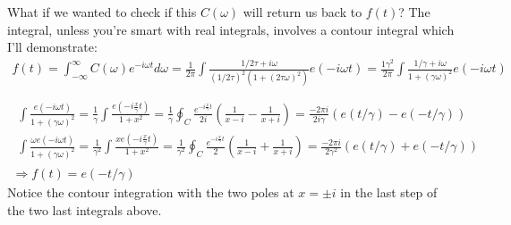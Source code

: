 \documentclass[twoside,10pt]{amsart}
\begin{document}
What if we wanted to check if this $C(\omega)$ will return us back to $f(t)$?  The integral, unless you're smart with real integrals, involves a contour integral which I'll demonstrate: 
\[
\begin{gathered}
  f(t) = \int_{-\infty}^{\infty} C(\omega) e^{- i \omega t} d\omega = \frac{1}{2\pi } \int \frac{ 1/2\tau + i \omega }{ (1/2\tau)^2 (1 + (2\tau \omega)^2 ) } e(-i\omega t) = \frac{1\gamma^2}{2\pi  } \int \frac{ 1/\gamma + i \omega }{ 1 + ( \gamma \omega)^2 } e(-i \omega t)  \\
\quad \\ 
\begin{gathered}
  \int \frac{ e(-i \omega t)}{ 1 + (\gamma \omega)^2 } = \frac{1}{ \gamma} \int \frac{e\left( -i \frac{x}{\gamma} t \right) }{ 1 + x^2 } = \frac{1}{ \gamma} \oint_C \frac{e^{ -i \frac{x}{\gamma} t } }{ 2 i } \left( \frac{1}{x-i} - \frac{1}{x+i} \right) = \frac{-2\pi i}{ 2i \gamma} (e(t/\gamma) - e(-t/\gamma)) \\
  \int \frac{ \omega e(-i \omega t)}{ 1 + (\gamma \omega)^2 } = \frac{1}{ \gamma^2} \int \frac{x e\left( -i \frac{x}{\gamma} t \right) }{ 1 + x^2 } = \frac{1}{ \gamma^2} \oint_C \frac{e^{ -i \frac{x}{\gamma} t } }{ 2  } \left( \frac{1}{x-i} + \frac{1}{x+i} \right) = \frac{-2\pi i}{ 2 \gamma^2} (e(t/\gamma) + e(-t/\gamma)) 
\end{gathered} \\
\Longrightarrow f(t) = e(-t/\gamma)
\end{gathered}
\]
Notice the contour integration with the two poles at $x=\pm i$ in the last step of the two last integrals above.  
\end{document}
